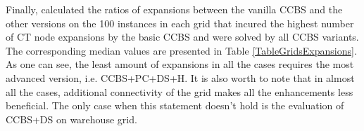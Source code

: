 \documentclass[letterpaper]{article} %
\newcommand{\ccbs}{\ac{CCBS}\xspace}
\newcommand{\ct}{\ac{CT}\xspace}
\begin{document}
\begin{table}
\caption{The ratio of expanded CT-nodes between CCBS and its modifications on grids.}
\label{TableGridsExpansions}
\end{table}


Finally, calculated the ratios of expansions between the vanilla CCBS and the other versions
on the 100 instances in each grid that incured the highest number of \ct node expansions by the basic \ccbs and were solved by all \ccbs variants. 
The corresponding median values are presented in Table \ref{TableGridsExpansions}. As one can see, the least amount of expansions in all the cases requires the most advanced version, i.e. CCBS+PC+DS+H. It is also worth to note that in almost all the cases, additional connectivity of the grid makes all the enhancements less beneficial. The only case when this statement doesn't hold is the evaluation of CCBS+DS on warehouse grid. 
\end{document}
